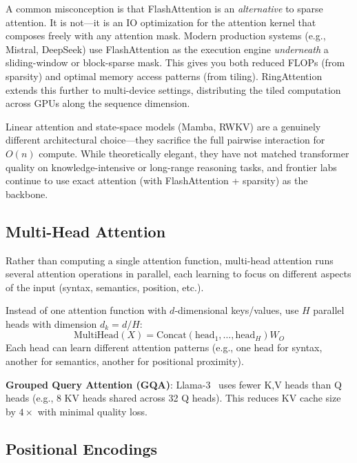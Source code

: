 \begin{intuitionbox}[FlashAttention + Sparse Patterns = Best of Both Worlds]
A common misconception is that FlashAttention is an \emph{alternative} to sparse attention. It is not---it is an IO optimization for the attention kernel that composes freely with any attention mask. Modern production systems (e.g., Mistral, DeepSeek) use FlashAttention as the execution engine \emph{underneath} a sliding-window or block-sparse mask. This gives you both reduced FLOPs (from sparsity) and optimal memory access patterns (from tiling). RingAttention~\cite{liu2023ringattention} extends this further to multi-device settings, distributing the tiled computation across GPUs along the sequence dimension.

Linear attention and state-space models (Mamba, RWKV) are a genuinely different architectural choice---they sacrifice the full pairwise interaction for $O(n)$ compute. While theoretically elegant, they have not matched transformer quality on knowledge-intensive or long-range reasoning tasks, and frontier labs continue to use exact attention (with FlashAttention + sparsity) as the backbone.
\end{intuitionbox}

\subsection{Multi-Head Attention}
\label{multi-head-attention}

Rather than computing a single attention function, multi-head attention runs several attention operations in parallel, each learning to focus on different aspects of the input (syntax, semantics, position, etc.).

\begin{keybox}
Instead of one attention function with $d$-dimensional keys/values, use $H$ parallel heads with dimension $d_k = d/H$: 
\[
\text{MultiHead}(X) = \text{Concat}(\text{head}_1, \ldots, \text{head}_H) W_O
\]
 Each head can learn different attention patterns (e.g., one head for syntax, another for semantics, another for positional proximity).

\textbf{Grouped Query Attention (GQA)}: Llama-3~\cite{grattafiori2024llama3} uses fewer K,V heads than Q heads (e.g., 8 KV heads shared across 32 Q heads). This reduces KV cache size by $4\times$ with minimal quality loss.
\end{keybox}

\subsection{Positional Encodings}
\label{positional-encodings}

